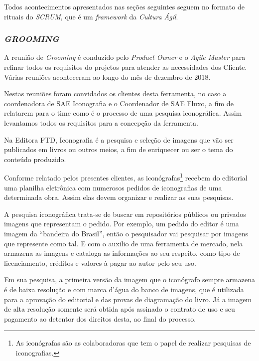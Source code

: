 \documentclass[
  12pt,            %
  openany,
  oneside,
  a4paper,         %
  english,      %
  brazil
]{article}
\numberwithin{figure}{section}
\numberwithin{table}{section}
\newcounter{subsubsubsection}[subsubsection]
\begin{document}
Todos acontecimentos apresentados nas seções seguintes seguem no formato de rituais do \textit{SCRUM}, que é um \textit{framework} da \textit{Cultura Ágil}.


\subsubsection{\textit{GROOMING}}

A reunião de \textit{Grooming} é conduzido pelo \textit{Product Owner} e o \textit{Agile Master} para refinar todos os requisitos do projetos para atender as necessidades dos Cliente. Várias reuniões aconteceram ao longo do mês de dezembro de 2018.

Nestas reuniões foram convidados os clientes desta ferramenta, no caso a coordenadora de SAE Iconografia e o Coordenador de SAE Fluxo, a fim de relatarem para o time como é o processo de uma pesquisa iconográfica. Assim levantamos todos os requisitos para a concepção da ferramenta.



Na Editora FTD, Iconografia é a pesquisa e seleção de imagens que vão ser publicados em livros ou outros meios, a fim de enriquecer ou ser o tema do conteúdo produzido.

Conforme relatado pelos presentes clientes, as iconógrafas\footnote{As iconógrafas são as colaboradoras que tem o papel de realizar pesquisas de iconografias.} recebem do editorial uma planilha eletrônica com numerosos pedidos de iconografias de uma determinada obra. Assim elas devem organizar e realizar as suas pesquisas.

A pesquisa iconográfica trata-se de buscar em repositórios públicos ou privados imagens que representam o pedido. Por exemplo, um pedido do editor é uma imagem da ``bandeira do Brasil'', então o pesquisador vai pesquisar por imagens que represente como tal. E com o auxilio de uma ferramenta de mercado, nela armazena as imagens e cataloga as informações ao seu respeito, como tipo de licenciamento, créditos e valores à pagar ao autor pelo seu uso.

Em sua pesquisa, a primeira versão da imagem que o iconógrafo sempre armazena é de baixa resolução e com marca d'água do banco de imagens, que é utilizada para a aprovação do editorial e das provas de diagramação do livro. Já a imagem de alta resolução somente será obtida após assinado o contrato de uso e seu pagamento ao detentor dos direitos desta, ao final do processo.
\end{document}
